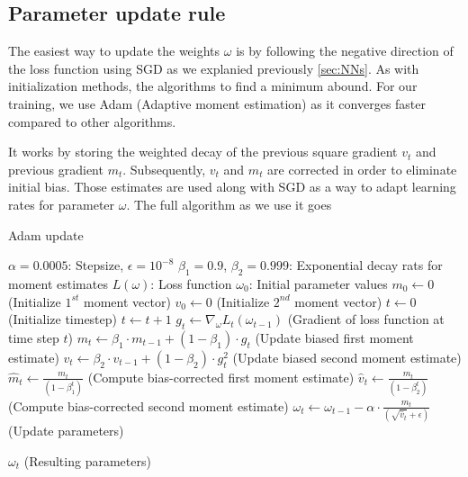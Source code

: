 \FloatBarrier

\subsection{Parameter update rule}     
The easiest way to update the weights $\omega$ is by following the negative direction of the loss function using SGD as we explanied previously \ref{sec:NNs}. As with initialization methods, the algorithms to find a minimum abound. For our training, we use Adam (Adaptive moment estimation) \cite{kingma2014adam} as it converges faster compared to other algorithms. \

It works by storing the weighted decay of the previous square gradient $v_t$ and previous gradient $m_t$. Subsequently, $v_t$ and $m_t$ are corrected in order to eliminate initial bias. Those estimates are used along with SGD as a way to adapt learning rates for parameter $\omega$. The full algorithm  as we use it goes     

\begin{algorithm}
\caption{Adam update}
\label{Adamalg}
\begin{algorithmic}[2]
    \Require $\alpha = 0.0005 $: Stepsize, $\epsilon = 10^{-8}$ 
    \Require $\beta_1 = 0.9$, $\beta_2 = 0.999$: Exponential decay rats for moment estimates
    \Require $L ( \omega ) $: Loss function
    \Require $ \omega_0 $: Initial parameter values
    \State $m_0 \leftarrow 0$ (Initialize $1^{st}$ moment vector)
    \State $v_0 \leftarrow 0$ (Initialize $2^{nd}$ moment vector)
    \State $t \leftarrow 0$ (Initialize timestep)
        \State $t \leftarrow t+1$ 
        \State $g_t \leftarrow \nabla_{\omega} L_t ( \omega_{t-1} )$ (Gradient of loss function at time step $t$)
        \State $m_t \leftarrow \beta_1 \cdot m_{t-1} + ( 1 -  \beta_1) \cdot g_t $ (Update biased first moment estimate)
        \State $v_t \leftarrow \beta_2 \cdot v_{t-1} + (1 - \beta_2) \cdot g_{t}^2 $ (Update biased second moment estimate)
        \State $\hat{m}_t \leftarrow \frac{m_t}{( 1 - \beta_{1}^{t} )}$  (Compute bias-corrected first moment estimate)
        \State $\hat{v}_t \leftarrow \frac{m_t}{( 1 - \beta_{2}^{t} )}$  (Compute bias-corrected second moment estimate)
        \State $\omega_t \leftarrow \omega_{t-1} - \alpha \cdot \frac{ \hat{m}_t }{ ( \sqrt{\hat{v}_t } + \epsilon ) } $ (Update parameters)

    \EndWhile
    
    \State \Return $\omega_t $ (Resulting parameters)   
\end{algorithmic}
\end{algorithm}

